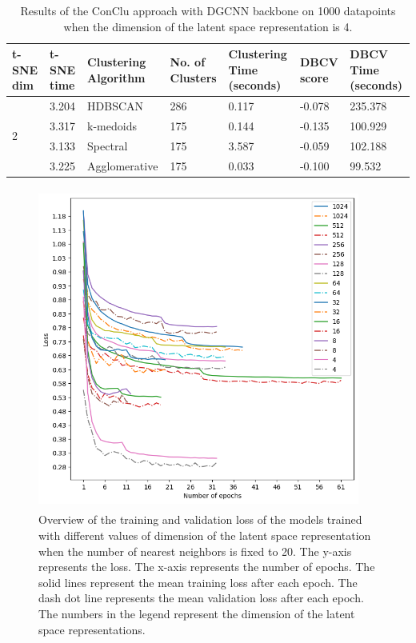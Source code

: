 \begin{table}[H]
  \setlength\extrarowheight{10pt}
  \caption{Results of the ConClu approach with \ac{DGCNN} backbone on 1000 datapoints when the dimension of the latent space representation is 4. }
  \centering
  \begin{tabular}{|p{30pt}|p{50pt}|p{60pt}|p{50pt}|p{50pt}|p{50pt}|p{40pt}|}
    \toprule
    \ac{t-SNE} dim	& \ac{t-SNE} time & Clustering Algorithm & No. of Clusters & Clustering Time (seconds) & \ac{DBCV} score & \ac{DBCV} Time (seconds)\\
    \midrule
    \multirow{4}{30pt}{2}	& 3.204	& \ac{HDBSCAN}	& 286	& 0.117	& -0.078	& 235.378 \\ \cline{2-7} 
    & 3.317 & k-medoids	& 175	& 0.144	& -0.135	& 100.929 \\ \cline{2-7} 
    & 3.133	& Spectral	& 175	& 3.587	& -0.059	& 102.188 \\ \cline{2-7}
    & 3.225	& Agglomerative	& 175	& 0.033	& -0.100	& 99.532 \\ 
    \bottomrule
  \end{tabular}
  \label{tab:dgcnn_4}
\end{table}

\begin{figure}[H]
  \centering
  \includegraphics[width=300pt,height=300pt]{pictures/loss_dgcnn.png}
  \caption{Overview of the training and validation loss of the models trained with different values of dimension of the latent space representation when the number of nearest neighbors is fixed to 20. The y-axis represents the loss. The x-axis represents the number of epochs. The solid lines represent the mean training loss after each epoch. The dash dot line represents the mean validation loss after each epoch. The numbers in the legend represent the dimension of the latent space representations.}
  \label{fig:loss_dgcnn}
\end{figure} 


